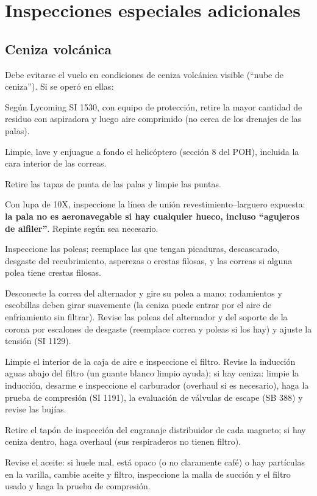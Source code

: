 \section{Inspecciones especiales adicionales}

\subsection{Ceniza volcánica}

Debe evitarse el vuelo en condiciones de ceniza volcánica visible (``nube de ceniza''). Si se operó en ellas:

\begin{pasos}
\item Según Lycoming SI 1530, con equipo de protección, retire la mayor cantidad de residuo con aspiradora y luego aire comprimido (no cerca de los drenajes de las palas).
\item Limpie, lave y enjuague a fondo el helicóptero (sección 8 del POH), incluida la cara interior de las correas.
\item Retire las tapas de punta de las palas y limpie las puntas.
\item Con lupa de 10X, inspeccione la línea de unión revestimiento--larguero expuesta: \textbf{la pala no es aeronavegable si hay cualquier hueco, incluso ``agujeros de alfiler''}. Repinte según sea necesario.
\item Inspeccione las poleas; reemplace las que tengan picaduras, descascarado, desgaste del recubrimiento, asperezas o crestas filosas, y las correas si alguna polea tiene crestas filosas.
\item Desconecte la correa del alternador y gire su polea a mano: rodamientos y escobillas deben girar suavemente (la ceniza puede entrar por el aire de enfriamiento sin filtrar). Revise las poleas del alternador y del soporte de la corona por escalones de desgaste (reemplace correa y poleas si los hay) y ajuste la tensión (SI 1129).
\item Limpie el interior de la caja de aire e inspeccione el filtro. Revise la inducción aguas abajo del filtro (un guante blanco limpio ayuda); si hay ceniza: limpie la inducción, desarme e inspeccione el carburador (overhaul si es necesario), haga la prueba de compresión (SI 1191), la evaluación de válvulas de escape (SB 388) y revise las bujías.
\item Retire el tapón de inspección del engranaje distribuidor de cada magneto; si hay ceniza dentro, haga overhaul (sus respiraderos no tienen filtro).
\item Revise el aceite: si huele mal, está opaco (o no claramente café) o hay partículas en la varilla, cambie aceite y filtro, inspeccione la malla de succión y el filtro usado y haga la prueba de compresión.
\end{pasos}

